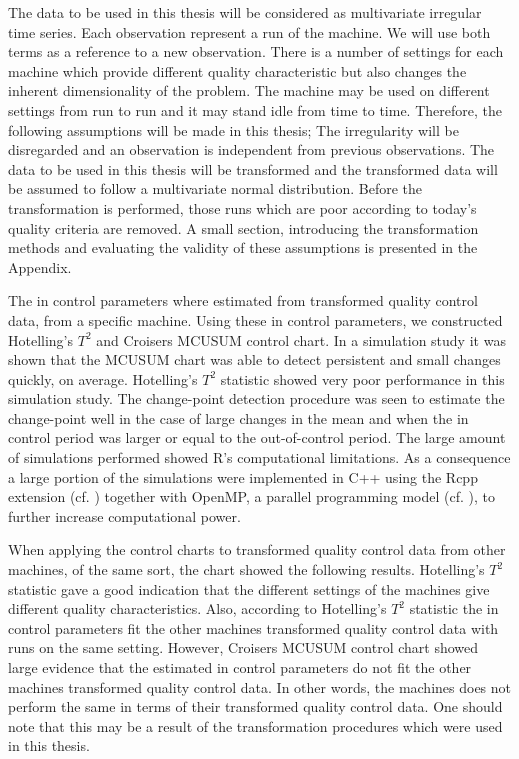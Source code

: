 The data to be used in this thesis will be considered as multivariate irregular time series. Each observation represent a run of the machine. We will use both terms as a reference to a new observation. There is a number of settings for each machine which provide different quality characteristic but also changes the inherent dimensionality of the problem. The machine may be used on different settings from run to run and it may stand idle from time to time. Therefore, the following assumptions will be made in this thesis; The irregularity will be disregarded and an observation is independent from previous observations. The data to be used in this thesis will be transformed and the transformed data will be assumed to follow a multivariate normal distribution. Before the transformation is performed, those runs which are poor according to today’s quality criteria are removed. A small section, introducing the transformation methods and evaluating the validity of these assumptions is presented in the Appendix.

The in control parameters where estimated from transformed quality control data, from a specific machine. Using these in control parameters, we constructed Hotelling's $T^2$ and Croisers MCUSUM control chart. In a simulation study it was shown that the MCUSUM chart was able to detect persistent and small changes quickly, on average. Hotelling's $T^2$ statistic showed very poor performance in this simulation study. The change-point detection procedure was seen to estimate the change-point well in the case of large changes in the mean and when the in control period was larger or equal to the out-of-control period. The large amount of simulations performed showed \textsf{R}'s computational limitations. As a consequence a large portion of the simulations were implemented in C++ using the Rcpp extension (cf. \citet{Rcpp}) together with OpenMP, a parallel programming model (cf. \citet{OpenMP}), to further increase computational power.

When applying the control charts to transformed quality control data from other machines, of the same sort, the chart showed the following results. Hotelling's $T^2$ statistic gave a good indication that the different settings of the machines give different quality characteristics. Also, according to Hotelling's $T^2$ statistic the in control parameters fit the other machines transformed quality control data with runs on the same setting. However, Croisers MCUSUM control chart showed large evidence that the estimated in control parameters do not fit the other machines transformed quality control data. In other words, the machines does not perform the same in terms of their transformed quality control data. One should note that this may be a result of the transformation procedures which were used in this thesis.


